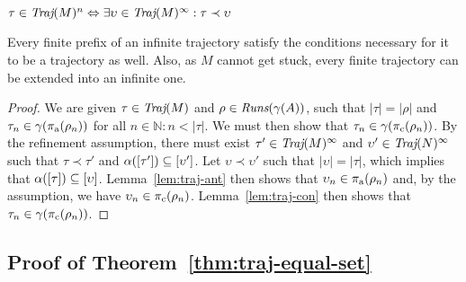 \begin{lemma} \label{lem:traj-fin-inf}
$\tau \in \operatorname{\textit{Traj}}(M)^{n} \Leftrightarrow \exists \upsilon \in \operatorname{\textit{Traj}}(M)^{\infty} : \tau \prec \upsilon$
\end{lemma}
%
Every finite prefix of an infinite trajectory satisfy the conditions necessary for it to be a trajectory as well. Also, as $M$ cannot get stuck, every finite trajectory can be extended into an infinite one.

\begin{proof}
We are given $\tau \in \operatorname{\textit{Traj}}(M)$ and $\rho \in \operatorname{\textit{Runs}}(\gamma(A))$, such that $| \tau | = | \rho |$ and $\tau_{n} \in \gamma(\operatorname{\pi_{\textrm{a}}}(\rho_{n}))$ for all $n \in \mathbb{N} : n < | \tau |$. We must then show that $\tau_{n} \in \gamma(\operatorname{\pi_{\textrm{c}}}(\rho_{n}))$. By the refinement assumption, there must exist $\tau' \in \operatorname{\textit{Traj}}(M)^{\infty}$ and $\upsilon' \in \operatorname{\textit{Traj}}(N)^{\infty}$ such that $\tau \prec \tau'$ and $\alpha([\tau']) \subseteq [\upsilon']$. Let $\upsilon \prec \upsilon'$ such that $| \upsilon | = | \tau |$, which implies that $\alpha([\tau]) \subseteq [\upsilon]$. Lemma~\ref{lem:traj-ant} then shows that $\upsilon_{n} \in \operatorname{\pi_{\textrm{a}}}(\rho_{n})$ and, by the assumption, we have $\upsilon_{n} \in \operatorname{\pi_{\textrm{c}}}(\rho_{n})$. Lemma~\ref{lem:traj-con} then shows that $\tau_{n} \in \gamma(\operatorname{\pi_{\textrm{c}}}(\rho_{n}))$.
\end{proof}

\subsection{Proof of Theorem~\ref{thm:traj-equal-set}}

